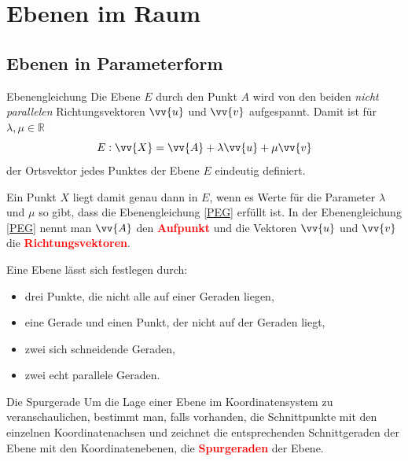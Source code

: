\section{Ebenen im Raum}
\subsection{Ebenen in Parameterform}
\begin{defi}{Ebenengleichung}{}
    Die Ebene \(E\) durch den Punkt \(A\) wird von den beiden \textit{nicht parallelen} Richtungsvektoren \(\vv{u}\) und \(\vv{v}\) aufgespannt. Damit ist für \(\lambda, \mu \in \mathds{R}\) \begin{equation}\label{PEG}       
    E:\vv{X} = \vv{A} + \lambda\vv{u} + \mu\vv{v}\end{equation}
    der Ortsvektor jedes Punktes der Ebene \(E\) eindeutig definiert.
\end{defi}
\begin{b8d}{}{}
Ein Punkt \(X\) liegt damit genau dann in \(E\), wenn es Werte für die Parameter \(\lambda\) und \(\mu\) so gibt, dass die Ebenengleichung \ref{PEG} erfüllt ist. In der Ebenengleichung \ref{PEG} nennt man \(\vv{A}\) den \textcolor{red}{\textbf{Aufpunkt}} und die Vektoren \(\vv{u}\) und \(\vv{v}\) die \textcolor{red}{\textbf{Richtungsvektoren}}.
\end{b8d}
\begin{merke}{}{}
    Eine Ebene lässt sich festlegen durch:
    \begin{itemize}
        \item drei Punkte, die nicht alle auf einer Geraden liegen,
        \item eine Gerade und einen Punkt, der nicht auf der Geraden liegt,
        \item zwei sich schneidende Geraden,
        \item zwei echt parallele Geraden.
    \end{itemize}
\end{merke}
    \begin{b8d}{Die Spurgerade}{}
    Um die Lage einer Ebene im Koordinatensystem zu veranschaulichen, bestimmt man, falls vorhanden, die Schnittpunkte mit den einzelnen Koordinatenachsen und zeichnet die entsprechenden Schnittgeraden der Ebene mit den Koordinatenebenen, die \textcolor{red}{\textbf{Spurgeraden}} der Ebene.  
    \end{b8d}
